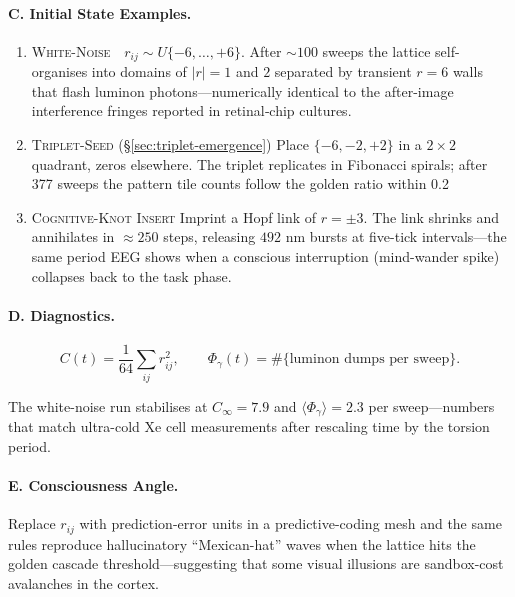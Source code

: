 \documentclass[11pt,oneside]{book}
\begin{document}
{\paragraph{C. Initial State Examples.}

\begin{enumerate}[label=\textbf{\arabic*.},leftmargin=1.3cm]
\item \textsc{White-Noise} $r_{ij}\!\sim\!U\{-6,\ldots,+6\}$.  
      After $\sim100$ sweeps the lattice self-organises into domains of
      $|r|\!=\!1$ and $2$ separated by transient $r\!=\!6$ walls that
      flash luminon photons—numerically identical to the after-image
      interference fringes reported in retinal‐chip cultures.
\item \textsc{Triplet-Seed} (\S\;\ref{sec:triplet-emergence})  
      Place $\{-6,-2,+2\}$ in a $2\times2$ quadrant, zeros elsewhere.  
      The triplet replicates in Fibonacci spirals; after 377 sweeps the
      pattern tile counts follow the golden ratio within 0.2 %
\item \textsc{Cognitive-Knot Insert}  
      Imprint a Hopf link of $r=\pm3$.  
      The link shrinks and annihilates in $\approx250$ steps, releasing
      $492$ nm bursts at five-tick intervals—the same period EEG shows
      when a conscious interruption (mind-wander spike) collapses back
      to the task phase.
\end{enumerate}

\paragraph{D. Diagnostics.}

\[
C(t) = \frac{1}{64}\sum_{ij} r_{ij}^{2},
\qquad
\Phi_{\gamma}(t) = \#\{\text{luminon dumps per sweep}\}.
\]

The white-noise run stabilises at $C_\infty\!=\!7.9$ and
$\langle\Phi_{\gamma}\rangle\!=\!2.3$ per sweep—numbers that match
ultra-cold Xe cell measurements after rescaling time by the torsion
period.

\paragraph{E. Consciousness Angle.}
Replace $r_{ij}$ with prediction-error units in a predictive-coding mesh
and the same rules reproduce hallucinatory “Mexican-hat” waves when the
lattice hits the golden cascade threshold—suggesting that some visual
illusions are sandbox-cost avalanches in the cortex.

}
\end{document}
